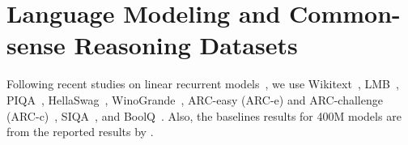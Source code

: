 \section{Language Modeling and Common-sense Reasoning Datasets}\label{app:exp-details}
Following recent studies on linear recurrent models~\citep{yang2024gated, dao2024transformers, yang2024parallelizing}, we use Wikitext~\citep{merity2017pointer}, LMB~\citep{paperno-etal-2016-lambada}, PIQA~\citep{bisk2020piqa}, HellaSwag~\citep{zellers-etal-2019-hellaswag}, WinoGrande~\citep{sakaguchi2021winogrande},  ARC-easy (ARC-e) and ARC-challenge (ARC-c)~\citep{clark2018think}, SIQA~\citep{sap-etal-2019-social}, and BoolQ~\citep{clark-etal-2019-boolq}. Also, the baselines results for 400M models are from the reported results by \citet{yang2024gated}. 



